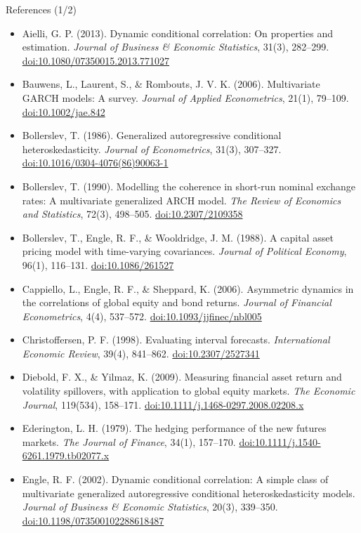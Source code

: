 \begin{frame}{References (1/2)}
\itemsize{\scriptsize}
\begin{itemize}
    \item Aielli, G. P. (2013). Dynamic conditional correlation: On properties and estimation. \textit{Journal of Business \& Economic Statistics}, 31(3), 282--299. \href{https://doi.org/10.1080/07350015.2013.771027}{doi:10.1080/07350015.2013.771027}
    \item Bauwens, L., Laurent, S., \& Rombouts, J. V. K. (2006). Multivariate GARCH models: A survey. \textit{Journal of Applied Econometrics}, 21(1), 79--109. \href{https://doi.org/10.1002/jae.842}{doi:10.1002/jae.842}
    \item Bollerslev, T. (1986). Generalized autoregressive conditional heteroskedasticity. \textit{Journal of Econometrics}, 31(3), 307--327. \href{https://doi.org/10.1016/0304-4076(86)90063-1}{doi:10.1016/0304-4076(86)90063-1}
    \item Bollerslev, T. (1990). Modelling the coherence in short-run nominal exchange rates: A multivariate generalized ARCH model. \textit{The Review of Economics and Statistics}, 72(3), 498--505. \href{https://doi.org/10.2307/2109358}{doi:10.2307/2109358}
    \item Bollerslev, T., Engle, R. F., \& Wooldridge, J. M. (1988). A capital asset pricing model with time-varying covariances. \textit{Journal of Political Economy}, 96(1), 116--131. \href{https://doi.org/10.1086/261527}{doi:10.1086/261527}
    \item Cappiello, L., Engle, R. F., \& Sheppard, K. (2006). Asymmetric dynamics in the correlations of global equity and bond returns. \textit{Journal of Financial Econometrics}, 4(4), 537--572. \href{https://doi.org/10.1093/jjfinec/nbl005}{doi:10.1093/jjfinec/nbl005}
    \item Christoffersen, P. F. (1998). Evaluating interval forecasts. \textit{International Economic Review}, 39(4), 841--862. \href{https://doi.org/10.2307/2527341}{doi:10.2307/2527341}
    \item Diebold, F. X., \& Yilmaz, K. (2009). Measuring financial asset return and volatility spillovers, with application to global equity markets. \textit{The Economic Journal}, 119(534), 158--171. \href{https://doi.org/10.1111/j.1468-0297.2008.02208.x}{doi:10.1111/j.1468-0297.2008.02208.x}
    \item Ederington, L. H. (1979). The hedging performance of the new futures markets. \textit{The Journal of Finance}, 34(1), 157--170. \href{https://doi.org/10.1111/j.1540-6261.1979.tb02077.x}{doi:10.1111/j.1540-6261.1979.tb02077.x}
    \item Engle, R. F. (2002). Dynamic conditional correlation: A simple class of multivariate generalized autoregressive conditional heteroskedasticity models. \textit{Journal of Business \& Economic Statistics}, 20(3), 339--350. \href{https://doi.org/10.1198/073500102288618487}{doi:10.1198/073500102288618487}
\end{itemize}
\end{frame}

